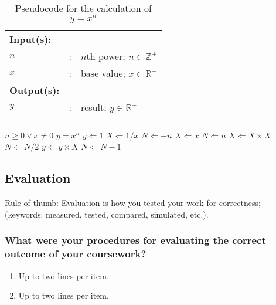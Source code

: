 \begin{table}[!b]
	\caption{Pseudocode for the calculation of $y = x^n$}
	\label{tab:calcxn}	
	\centering
	{\footnotesize
	\begin{tabular}{lll}
	\hline
	\hline
	{\bfseries Input(s):} & & \\
	$n$ & : & $n$th power; $n \in \mathbb{Z}^{+}$ \\
	$x$ & : & base value; $x \in \mathbb{R}^{+}$ \\
	\hline
	{\bfseries Output(s):} & & \\
	$y$ & : & result; $y \in \mathbb{R}^{+}$  \\
	\hline
	\hline
	\\
	\end{tabular}
	}
	\begin{algorithmic}[1]
	{\footnotesize
		\REQUIRE $n \geq 0 \vee x \neq 0$
		\ENSURE $y = x^n$
		\STATE $y \Leftarrow 1$
				\STATE $X \Leftarrow 1 / x$
				\STATE $N \Leftarrow -n$
		\ELSE
				\STATE $X \Leftarrow x$
				\STATE $N \Leftarrow n$
		\ENDIF
						\STATE $X \Leftarrow X \times X$
						\STATE $N \Leftarrow N / 2$
				\ELSE[$N$ is odd]
						\STATE $y \Leftarrow y \times X$
						\STATE $N \Leftarrow N - 1$
				\ENDIF
		\ENDWHILE
	}
	\end{algorithmic}
\end{table}







\subsection{Evaluation}
\label{sec:eval}

Rule of thumb: Evaluation is how you tested your work for correctness; (keywords: measured, tested, compared, simulated, etc.).

\subsubsection{What were your procedures for evaluating the correct outcome of your coursework?}
\begin{enumerate}
\item Up to two lines per item.
\item Up to two lines per item.
\end{enumerate}
	

